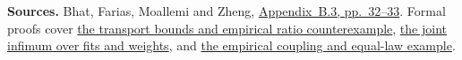 \documentclass[12pt,a4paper]{article}
\newcommand{\lead}[1]{\par\smallskip\noindent\textbf{#1}\enspace}
\begin{document}
{\small\raggedright
\lead{Sources.} Bhat, Farias, Moallemi and Zheng,
\href{https://moallemi.com/ciamac/papers/kernel-adp-2012.pdf\#page=32}{Appendix~B.3, pp.~32--33}.
Formal proofs cover
\href{https://github.com/nikhilpb/kadp/blob/main/lean/SamplingLaw.lean}{the transport bounds and empirical ratio counterexample},
\href{https://github.com/nikhilpb/kadp/blob/main/lean/WeightedSampling.lean}{the joint infimum over fits and weights}, and
\href{https://github.com/nikhilpb/kadp/blob/main/lean/SamplingCoupling.lean}{the empirical coupling and equal-law example}.\par}
\end{document}
